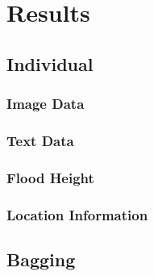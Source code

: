 \chapter{Results}

\section{Individual}
\subsection{Image Data}
\subsection{Text Data}
\subsection{Flood Height}
\subsection{Location Information}


\section{Bagging}
